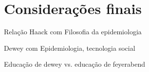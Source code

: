 \documentclass[12pt]{report}
\begin{document}
	

	\vspace*{-0.6cm}
	\chapter*{Considerações finais}
	\vspace*{-0.75cm}
	
	Relação Haack com Filosofia da epidemiologia
	
	Dewey com Epidemiologia, tecnologia social
	
	Educação de dewey vs. educação de feyerabend
	
	\nocite{cunha-unidade}
	\nocite{haack-six-signs}
	\nocite{dewey-ee}
	\nocite{dewey-en}
	\printbibliography
	
\end{document}
